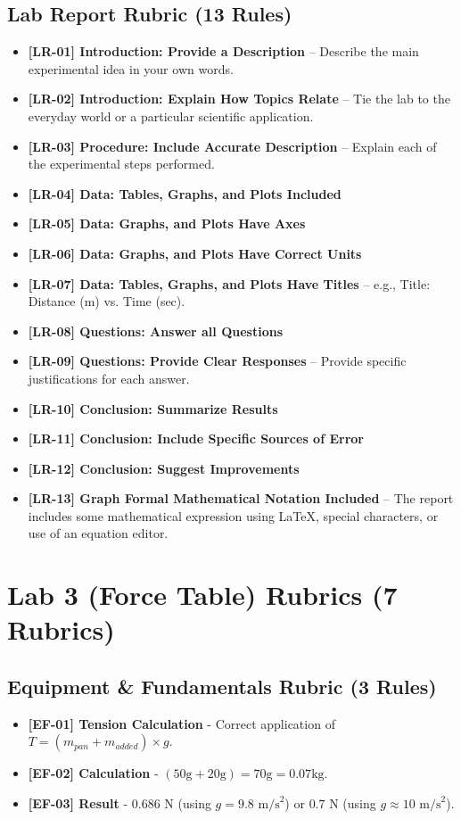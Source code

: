 \documentclass{article}
\begin{document}
\subsection*{Lab Report Rubric (13 Rules)}
\begin{itemize}
\item \textbf{ [LR-01] Introduction: Provide a Description } –  Describe the main experimental idea in your own words.
\item \textbf{ [LR-02] Introduction:  Explain How Topics Relate } – Tie the lab to the everyday world or a particular scientific application.
\item \textbf{ [LR-03] Procedure: Include Accurate Description } – Explain each of the experimental steps performed.
\item \textbf{ [LR-04] Data: Tables, Graphs, and Plots Included }
\item \textbf{ [LR-05] Data:  Graphs, and Plots Have Axes }
\item \textbf{ [LR-06] Data: Graphs, and Plots Have Correct Units }
\item \textbf{ [LR-07] Data: Tables, Graphs, and Plots Have Titles } – e.g., Title: Distance (m) vs. Time (sec).
\item \textbf{ [LR-08] Questions:  Answer all Questions } 
\item \textbf{ [LR-09] Questions:  Provide Clear Responses } – Provide specific justifications for each answer.
\item \textbf{ [LR-10] Conclusion:  Summarize Results }
\item \textbf{ [LR-11] Conclusion:  Include Specific Sources of Error }
\item \textbf{ [LR-12] Conclusion:  Suggest Improvements }
\item \textbf{ [LR-13] Graph Formal Mathematical Notation Included } –  The report includes some mathematical expression using LaTeX, special characters, or use of an equation editor. 
\end{itemize}

\section*{Lab 3 (Force Table) Rubrics (7 Rubrics)}

\subsection*{ Equipment \& Fundamentals Rubric (3 Rules) }
\begin{itemize}
\item \textbf{ [EF-01] Tension Calculation } - Correct application of $T = (m_{pan} + m_{added}) \times g$.
\item \textbf{ [EF-02] Calculation } - $(50\text{g} + 20\text{g}) = 70\text{g} = 0.07\text{kg}$.
\item \textbf{ [EF-03] Result } - $0.686\text{ N}$ (using $g = 9.8\text{ m/s}^2$) or $0.7\text{ N}$ (using $g \approx 10\text{ m/s}^2$).
\end{itemize}
\end{document}
